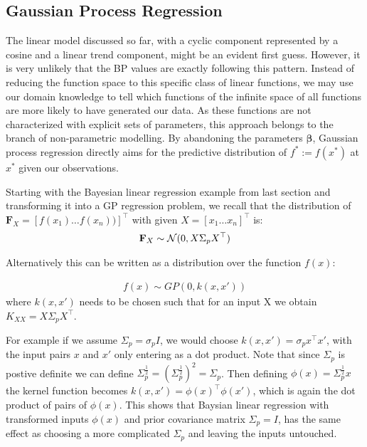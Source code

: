 \subsection{Gaussian Process Regression}
The linear model discussed so far, with a cyclic component represented by a cosine and a linear trend component,
might be an evident first guess. However, it is very unlikely that the BP values are exactly following this pattern.
Instead of reducing the function space to this specific class of linear functions, we may use our domain knowledge
to tell which functions of the infinite space of all functions are more likely to have generated our data.
As these functions are not characterized with explicit sets of
parameters, this approach belongs to the branch of non-parametric modelling.
By abandoning the parameters $\boldsymbol{\beta}$, Gaussian process regression
directly aims for the predictive distribution of $f^{\ast} := f(x^{\ast})$ at $x^{\ast}$ given our observations.

Starting with the Bayesian linear regression example from last section and transforming it into a GP regression
problem, we recall that the distribution of $\mathbf{F}_X = [f(x_1) \dots f(x_n))]^{\top}$ with given $X = [x_1 \dots x_n]^{\top}$ is:
\begin{gather*}
    \mathbf{F}_X \sim \operatorname{\mathcal{N}}(0,  X \Sigma_p X^{\top})
\end{gather*}

Alternatively this can be written as a distribution over the function $f(x)$:

\begin{gather*}
    f(x) \sim GP(0, k(x, x'))
\end{gather*}
where $k(x,x')$ needs to be chosen such that for an input X we obtain $K_{XX} =  X \Sigma_p X^{\top}$.

For example if we assume $\Sigma_p = \sigma_p I$, we would choose $k(x,x') = \sigma_p x^{\top} x'$, with the
input pairs $x$ and $x'$ only entering as a dot product.
Note that since $\Sigma_p$ is postive definite we can define $\Sigma_p^{\frac{1}{2}} = (\Sigma_p^{\frac{1}{2}})^2=\Sigma_p$.
Then defining $\phi(x) = \Sigma_p^{\frac{1}{2}} x$ the kernel function becomes $k(x, x') = \phi(x)^{\top} \phi(x')$,
which is again the dot product of pairs of $\phi(x)$.
This shows that Baysian linear regression with transformed inputs $\phi(x)$ and prior covariance matrix $\Sigma_p = I$,
has the same effect as choosing a more complicated $\Sigma_p$ and leaving the inputs untouched.




